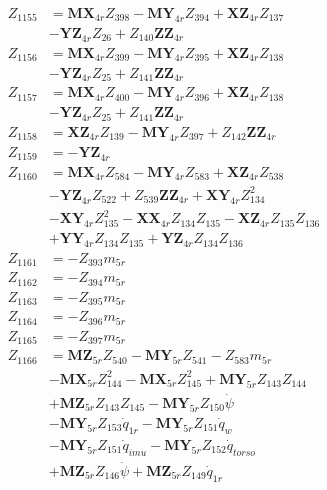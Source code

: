 \begin{multicols}{2}
\begin{align}
Z_{1155} &= \mathbf{MX}_{4r}Z_{398} - \mathbf{MY}_{4r}Z_{394} + \mathbf{XZ}_{4r}Z_{137}  \nonumber \\
&- \mathbf{YZ}_{4r}Z_{26} + Z_{140}\mathbf{ZZ}_{4r} \nonumber \\
Z_{1156} &= \mathbf{MX}_{4r}Z_{399} - \mathbf{MY}_{4r}Z_{395} + \mathbf{XZ}_{4r}Z_{138}  \nonumber \\
&- \mathbf{YZ}_{4r}Z_{25} + Z_{141}\mathbf{ZZ}_{4r} \nonumber \\
Z_{1157} &= \mathbf{MX}_{4r}Z_{400} - \mathbf{MY}_{4r}Z_{396} + \mathbf{XZ}_{4r}Z_{138}  \nonumber \\
&- \mathbf{YZ}_{4r}Z_{25} + Z_{141}\mathbf{ZZ}_{4r} \nonumber \\
Z_{1158} &= \mathbf{XZ}_{4r}Z_{139} - \mathbf{MY}_{4r}Z_{397} + Z_{142}\mathbf{ZZ}_{4r} \nonumber \\
Z_{1159} &= -\mathbf{YZ}_{4r} \nonumber \\
Z_{1160} &= \mathbf{MX}_{4r}Z_{584} - \mathbf{MY}_{4r}Z_{583} + \mathbf{XZ}_{4r}Z_{538}  \nonumber \\
&- \mathbf{YZ}_{4r}Z_{522} + Z_{539}\mathbf{ZZ}_{4r} + \mathbf{XY}_{4r}Z_{134}^2  \nonumber \\
&- \mathbf{XY}_{4r}Z_{135}^2 - \mathbf{XX}_{4r}Z_{134}Z_{135} - \mathbf{XZ}_{4r}Z_{135}Z_{136}  \nonumber \\
&+ \mathbf{YY}_{4r}Z_{134}Z_{135} + \mathbf{YZ}_{4r}Z_{134}Z_{136} \nonumber \\
Z_{1161} &= -Z_{393}m_{5r} \nonumber \\
Z_{1162} &= -Z_{394}m_{5r} \nonumber \\
Z_{1163} &= -Z_{395}m_{5r} \nonumber \\
Z_{1164} &= -Z_{396}m_{5r} \nonumber \\
Z_{1165} &= -Z_{397}m_{5r} \nonumber \\
Z_{1166} &= \mathbf{MZ}_{5r}Z_{540} - \mathbf{MY}_{5r}Z_{541} - Z_{583}m_{5r}  \nonumber \\
&- \mathbf{MX}_{5r}Z_{144}^2 - \mathbf{MX}_{5r}Z_{145}^2 + \mathbf{MY}_{5r}Z_{143}Z_{144}  \nonumber \\
&+ \mathbf{MZ}_{5r}Z_{143}Z_{145} - \mathbf{MY}_{5r}Z_{150}\dot{\psi}  \nonumber \\
&- \mathbf{MY}_{5r}Z_{153}\dot{q}_{1r} - \mathbf{MY}_{5r}Z_{151}\dot{q}_{w}  \nonumber \\
&- \mathbf{MY}_{5r}Z_{151}\dot{q}_{imu} - \mathbf{MY}_{5r}Z_{152}\dot{q}_{torso}  \nonumber \\
&+ \mathbf{MZ}_{5r}Z_{146}\dot{\psi} + \mathbf{MZ}_{5r}Z_{149}\dot{q}_{1r}  \nonumber \\

\end{align}
\end{multicols}
